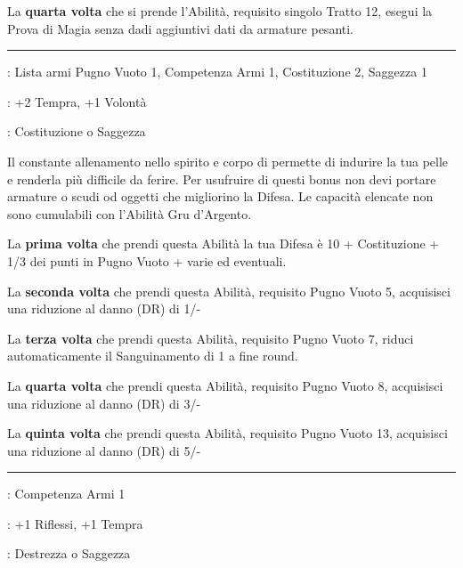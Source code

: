 \begin{multicols}{2}
La \textbf{quarta volta} che si prende l'Abilità, requisito singolo Tratto 12, esegui la Prova di Magia senza dadi aggiuntivi dati da armature pesanti.

\smallskip\noindent\rule{\linewidth}{2pt} \hypertarget{Armatura della Montagna Incantata}{}\medskip{}
\noindent
\begin{description}[noitemsep, topsep=0pt, parsep=0pt, partopsep=0pt, leftmargin=0cm, labelwidth=2.5cm]
    \item[\textbf{Requisito}]: Lista armi Pugno Vuoto 1, Competenza Armi 1, Costituzione 2, Saggezza 1
    \item[\textbf{Tiri Salvezza}]: +2 Tempra, +1 Volontà
    \item[\textbf{Caratteristica}]: Costituzione o Saggezza
\end{description}

Il constante allenamento nello spirito e corpo di permette di indurire la tua pelle e renderla più difficile da ferire. Per usufruire di questi bonus non devi portare armature o scudi od oggetti che migliorino la Difesa. Le capacità elencate non sono cumulabili con l'Abilità Gru d'Argento.

La \textbf{prima volta} che prendi questa Abilità la tua Difesa è 10 + Costituzione + 1/3 dei punti in Pugno Vuoto + varie ed eventuali.

La \textbf{seconda volta} che prendi questa Abilità, requisito Pugno Vuoto 5, acquisisci una riduzione al danno (DR) di 1/-

La \textbf{terza volta} che prendi questa Abilità, requisito Pugno Vuoto 7, riduci automaticamente il Sanguinamento di 1 a fine round.

La \textbf{quarta volta} che prendi questa Abilità, requisito Pugno Vuoto 8, acquisisci una riduzione al danno (DR) di 3/-

La \textbf{quinta volta} che prendi questa Abilità, requisito Pugno Vuoto 13, acquisisci una riduzione al danno (DR) di 5/-

\smallskip\noindent\rule{\linewidth}{2pt} \hypertarget{Arciere su saurovallo}{}\medskip{}
\noindent
\begin{description}[noitemsep, topsep=0pt, parsep=0pt, partopsep=0pt, leftmargin=0cm, labelwidth=2.5cm]
    \item[\textbf{Requisito}]: Competenza Armi 1
    \item[\textbf{Tiri Salvezza}]: +1 Riflessi, +1 Tempra
    \item[\textbf{Caratteristica}]: Destrezza o Saggezza
\end{description}


\end{multicols}
